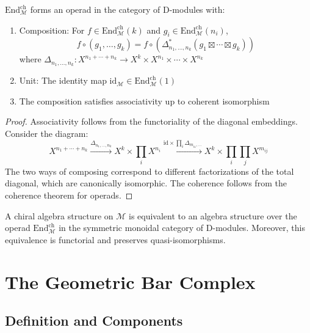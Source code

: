 \begin{proposition}
$\text{End}_{\mathcal{M}}^{\text{ch}}$ forms an operad in the category of D-modules with:
\begin{enumerate}
\item Composition: For $f \in \text{End}_{\mathcal{M}}^{\text{ch}}(k)$ and $g_i \in \text{End}_{\mathcal{M}}^{\text{ch}}(n_i)$,
\[
f \circ (g_1, \ldots, g_k) = f \circ \left(\Delta_{n_1,\ldots,n_k}^* (g_1 \boxtimes \cdots \boxtimes g_k)\right)
\]
where $\Delta_{n_1,\ldots,n_k}: X^{n_1 + \cdots + n_k} \to X^k \times X^{n_1} \times \cdots \times X^{n_k}$
 
\item Unit: The identity map $\text{id}_{\mathcal{M}} \in \text{End}_{\mathcal{M}}^{\text{ch}}(1)$
 
\item The composition satisfies associativity up to coherent isomorphism
\end{enumerate}
\end{proposition}
 
\begin{proof}
Associativity follows from the functoriality of the diagonal embeddings. Consider the diagram:
\[
X^{n_1 + \cdots + n_k} \xrightarrow{\Delta_{n_1,\ldots,n_k}} X^k \times \prod_i X^{n_i} 
\xrightarrow{\text{id} \times \prod_i \Delta_{m_{i1},\ldots}} X^k \times \prod_i \prod_j X^{m_{ij}}
\]
The two ways of composing correspond to different factorizations of the total diagonal, which are 
canonically isomorphic. The coherence follows from the coherence theorem for operads.
\end{proof}
 
\begin{theorem}
A chiral algebra structure on $\mathcal{M}$ is equivalent to an algebra structure over the operad 
$\text{End}_{\mathcal{M}}^{\text{ch}}$ in the symmetric monoidal category of D-modules. Moreover, this 
equivalence is functorial and preserves quasi-isomorphisms.
\end{theorem}
 
\section{The Geometric Bar Complex}
 
\subsection{Definition and Components}

